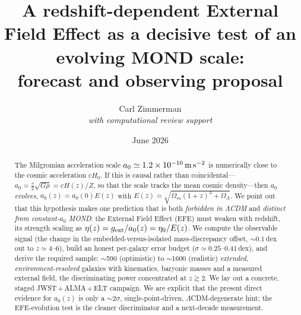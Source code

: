 \documentclass[11pt]{article}
\title{\bf A redshift-dependent External Field Effect as a decisive test of an
evolving MOND scale:\\ forecast and observing proposal}
\author{Carl Zimmerman\\[2pt]
\small\it with computational review support}
\date{June 2026}
\newcommand{\az}{a_0}
\newcommand{\gext}{g_{\rm ext}}
\newcommand{\Ez}{E(z)}
\begin{document}
\maketitle

\begin{abstract}
\noindent
The Milgromian acceleration scale $\az\simeq1.2\times10^{-10}\,{\rm m\,s^{-2}}$ is
numerically close to the cosmic acceleration $cH_0$. If this is causal rather than
coincidental---$\az=\tfrac{c}{2}\sqrt{G\rho}=cH(z)/Z$, so that the scale tracks the
mean cosmic density---then $\az$ \emph{evolves}, $\az(z)=\az(0)\Ez$ with
$\Ez=\sqrt{\Omega_m(1+z)^3+\Omega_\Lambda}$. We point out that this hypothesis makes
one prediction that is both \emph{forbidden in $\Lambda$CDM} and \emph{distinct from
constant-$\az$ MOND}: the External Field Effect (EFE) must weaken with redshift, its
strength scaling as $\eta(z)=\gext/\az(z)=\eta_0/\Ez$. We compute the observable
signal (the change in the embedded-versus-isolated mass-discrepancy offset, $\sim
0.1$\,dex out to $z\simeq4$--$6$), build an honest per-galaxy error budget
($\sigma\simeq0.25$--$0.41$\,dex), and derive the required sample: $\sim$590
(optimistic) to $\sim$1600 (realistic) \emph{extended, environment-resolved}
galaxies with kinematics, baryonic masses and a measured external field, the
discriminating power concentrated at $z\gtrsim2$. We lay out a concrete, staged
JWST\,+\,ALMA\,+\,ELT campaign. We are explicit that the present direct evidence for
$\az(z)$ is only a $\sim2\sigma$, single-point-driven, $\Lambda$CDM-degenerate hint;
the EFE-evolution test is the cleaner discriminator and a next-decade measurement.
\end{abstract}
\end{document}

